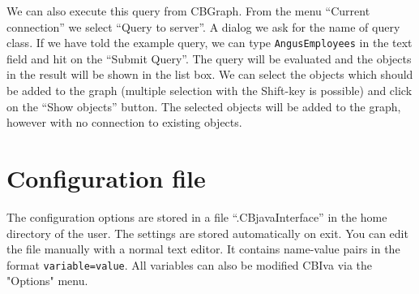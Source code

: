 
We can also execute this query from CBGraph. From the menu ``Current connection''
we select ``Query to server''. A dialog we ask for the name of query class. If we have
told the example query, we can type {\tt AngusEmployees} in the text field and
hit on the ``Submit Query''. The query will be evaluated and the objects in the result
will be shown in the list box. We can select the objects which should be added to the graph
(multiple selection with the Shift-key is possible) and click on the ``Show objects'' button.
The selected objects will be added to the graph, however with no connection to existing objects.


\section{Configuration file}
\label{sec:config}

The configuration options are stored in a file ``.CBjavaInterface'' in
the home directory of the user. The settings are stored automatically on exit.
You can edit the file manually with a normal text editor. It contains
name-value pairs in the format \verb+variable=value+. All variables
can also be modified CBIva via the "Options" menu.

